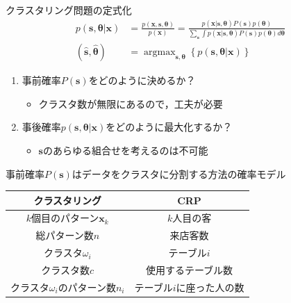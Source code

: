 \documentclass[10pt,fleqn]{beamer}
\DeclareMathOperator*{\argmax}{argmax}
\begin{document}
    \begin{frame}{クラスタリング問題の定式化}
        \begin{align*}
            p(\mathbf s, \bm\theta | \mathbf x)
            &= \frac{p(\mathbf x, \mathbf s, \bm\theta)}{p(\mathbf x)}
            = \frac{p(\mathbf x | \mathbf s, \bm\theta)P(\mathbf s)p(\bm\theta)}{\displaystyle \sum_{\mathbf s}\int p(\mathbf x | \mathbf s, \bm\theta)P(\mathbf s)p(\bm\theta)d\bm\theta} \tag{11.4}\\
            (\hat{\mathbf s}, \hat{\bm\theta}) &= \argmax_{\mathbf s,\bm\theta}\left\{ p(\mathbf s, \bm\theta | \mathbf x) \right\} \tag{11.5}
        \end{align*}
        \begin{enumerate}
            \item 事前確率$P(\mathbf s)$をどのように決めるか？
                \begin{itemize}
                    \item クラスタ数が無限にあるので，工夫が必要
                \end{itemize}
            \item 事後確率$p(\mathbf s, \bm\theta | \mathbf x)$をどのように最大化するか？
                \begin{itemize}
                    \item $\mathbf s$のあらゆる組合せを考えるのは不可能
                \end{itemize}
        \end{enumerate}
    \end{frame}
    
    \begin{frame}{事前確率$P(\mathbf s)$はデータをクラスタに分割する方法の確率モデル}
        \begin{center}
            \begin{tabular}{c|c}\hline 
                 クラスタリング&CRP \\ \hline 
                 $k$個目のパターン$\mathbf x_k$ & $k$人目の客 \\
                 総パターン数$n$ & 来店客数 \\
                 クラスタ$\omega_i$ & テーブル$i$ \\
                 クラスタ数$c$ & 使用するテーブル数 \\
                 クラスタ$\omega_i$のパターン数$n_i$ & テーブル$i$に座った人の数 \\ \hline 
            \end{tabular}
        \end{center}
    \end{frame}
    
\end{document}

